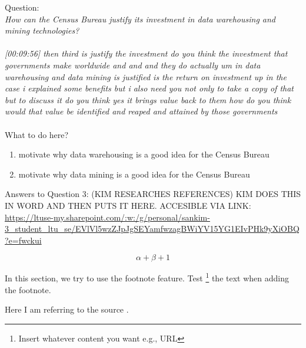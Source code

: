 Question:\\
\emph{
    How can the Census Bureau justify its investment in data warehousing and mining
technologies?
}\\\\

\emph{[00:09:56] then third is justify the investment do you think the investment that governments make worldwide
and and and they do actually um in data warehousing and data mining is justified is the return on investment
up in the case i explained some benefits but i also need you not only to take a copy of that but
to discuss it do you think yes it brings value back to them how do you think would that value be
identified and reaped and attained by those governments}\\\\

What to do here?
\begin{enumerate}
    \item motivate why data warehousing is a good idea for the Census Bureau
    \item motivate why data mining is a good idea for the Census Bureau
  \end{enumerate}

\newpage Answers to Question 3: (KIM RESEARCHES REFERENCES)
KIM DOES THIS IN WORD AND THEN PUTS IT HERE. ACCESIBLE VIA LINK:\\
\url{https://ltuse-my.sharepoint.com/:w:/g/personal/sankim-3_student_ltu_se/EVlVl5wzZJpJgSEYamfwzagBWiYV15YG1EIvPHk9yXiOBQ?e=fwckui}

\newpage 
\begin{equation}
\alpha + \beta + 1
\end{equation}

In this section, we try to use the footnote feature. 
Test \footnote{Insert whatever content you want e.g., URL} the text when adding the footnote.

Here I am referring to the source \cite{DataScience}.